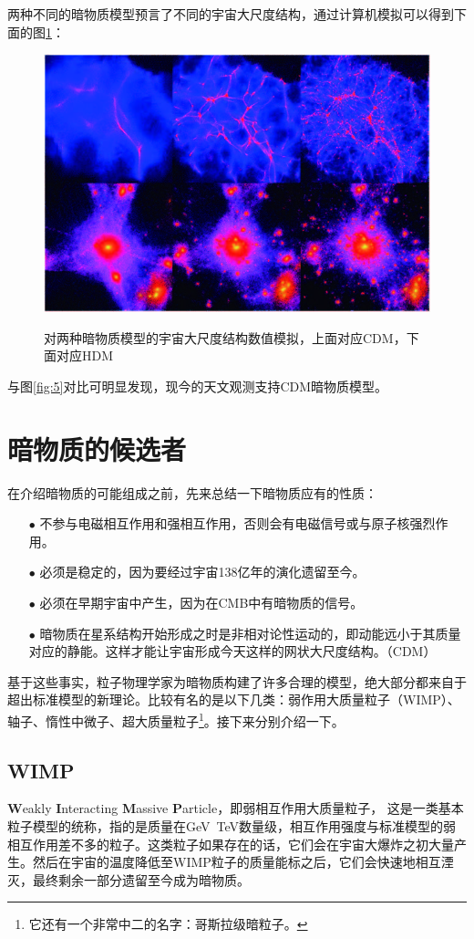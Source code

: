 \documentclass{ctexart}
\begin{document}
	两种不同的暗物质模型预言了不同的宇宙大尺度结构，通过计算机模拟可以得到下面的图\ref{fig:6}：
	\begin{figure}[h]
		\centering
		\includegraphics[width=.618\linewidth]{figs/fig6.jpg}
		\label{fig:6}
		\caption{对两种暗物质模型的宇宙大尺度结构数值模拟，上面对应CDM，下面对应HDM}
	\end{figure}
	与图\ref{fig:5}对比可明显发现，现今的天文观测支持CDM暗物质模型。
	
	\section{暗物质的候选者}
	在介绍暗物质的可能组成之前，先来总结一下暗物质应有的性质：
	\begin{enumerate}
		\item[$\bullet$] 不参与电磁相互作用和强相互作用，否则会有电磁信号或与原子核强烈作用。
		\item[$\bullet$] 必须是稳定的，因为要经过宇宙138亿年的演化遗留至今。
		\item[$\bullet$] 必须在早期宇宙中产生，因为在CMB中有暗物质的信号。
		\item[$\bullet$] 暗物质在星系结构开始形成之时是非相对论性运动的，即动能远小于其质量对应的静能。这样才能让宇宙形成今天这样的网状大尺度结构。（CDM）
	\end{enumerate}
	
	基于这些事实，粒子物理学家为暗物质构建了许多合理的模型，绝大部分都来自于超出标准模型的新理论。比较有名的是以下几类：弱作用大质量粒子（WIMP）、轴子、惰性中微子、超大质量粒子\footnote{它还有一个非常中二的名字：哥斯拉级暗粒子。}。接下来分别介绍一下。
	\subsection{WIMP}
	\textbf{W}eakly \textbf{I}nteracting \textbf{M}assive \textbf{P}article，即弱相互作用大质量粒子，
	这是一类基本粒子模型的统称，指的是质量在GeV~TeV数量级，相互作用强度与标准模型的弱相互作用差不多的粒子。这类粒子如果存在的话，它们会在宇宙大爆炸之初大量产生。然后在宇宙的温度降低至WIMP粒子的质量能标之后，它们会快速地相互湮灭，最终剩余一部分遗留至今成为暗物质。
	
\end{document}
